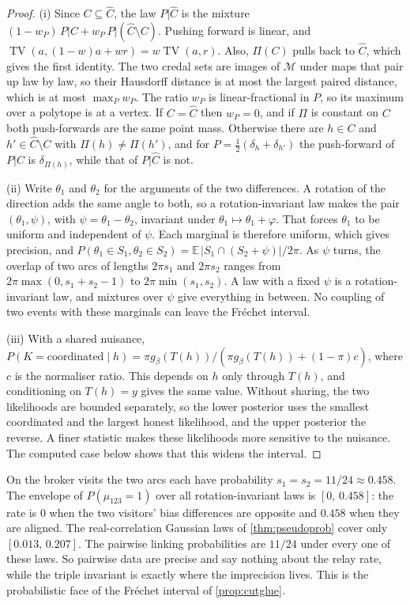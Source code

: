 \documentclass[11pt]{article}
\theoremstyle{definition}\newtheorem{definition}[theorem]{Definition}\newtheorem{remark}[theorem]{Remark}\newtheorem{example}[theorem]{Example}\newtheorem{problem}[theorem]{Open problem}\crefname{problem}{Problem}{Problems}
\begin{document}
\begin{proof}
(i) Since $C\subseteq\hat C$, the law $P|\hat C$ is the mixture $(1-w_P)\,P|C+w_P\,P|(\hat C\setminus C)$. Pushing forward is linear, and $\operatorname{TV}(a,(1-w)a+wr)=w\operatorname{TV}(a,r)$. Also, $\Pi(C)$ pulls back to $\hat C$, which gives the first identity. The two credal sets are images of $\mathcal M$ under maps that pair up law by law, so their Hausdorff distance is at most the largest paired distance, which is at most $\max_Pw_P$. The ratio $w_P$ is linear-fractional in $P$, so its maximum over a polytope is at a vertex. If $C=\hat C$ then $w_P=0$, and if $\Pi$ is constant on $C$ both push-forwards are the same point mass. Otherwise there are $h\in C$ and $h'\in\hat C\setminus C$ with $\Pi(h)\neq\Pi(h')$, and for $P=\tfrac12(\delta_h+\delta_{h'})$ the push-forward of $P|C$ is $\delta_{\Pi(h)}$, while that of $P|\hat C$ is not.

(ii) Write $\theta_1$ and $\theta_2$ for the arguments of the two differences. A rotation of the direction adds the same angle to both, so a rotation-invariant law makes the pair $(\theta_1,\psi)$, with $\psi=\theta_1-\theta_2$, invariant under $\theta_1\mapsto\theta_1+\varphi$. That forces $\theta_1$ to be uniform and independent of $\psi$. Each marginal is therefore uniform, which gives precision, and $P(\theta_1\in S_1,\theta_2\in S_2)=\mathbb E\,|S_1\cap(S_2+\psi)|/2\pi$. As $\psi$ turns, the overlap of two arcs of lengths $2\pi s_1$ and $2\pi s_2$ ranges from $2\pi\max(0,s_1+s_2-1)$ to $2\pi\min(s_1,s_2)$. A law with a fixed $\psi$ is a rotation-invariant law, and mixtures over $\psi$ give everything in between. No coupling of two events with these marginals can leave the Fr\'echet interval.

(iii) With a shared nuisance, $P(K=\text{coordinated}\mid h)=\pi g_\beta(T(h))/(\pi g_\beta(T(h))+(1-\pi)c)$, where $c$ is the normaliser ratio. This depends on $h$ only through $T(h)$, and conditioning on $T(h)=y$ gives the same value. Without sharing, the two likelihoods are bounded separately, so the lower posterior uses the smallest coordinated and the largest honest likelihood, and the upper posterior the reverse. A finer statistic makes these likelihoods more sensitive to the nuisance. The computed case below shows that this widens the interval.
\end{proof}

On the broker visits the two arcs each have probability $s_1=s_2=11/24\approx0.458$. The envelope of $P(\mu_{123}=1)$ over all rotation-invariant laws is $[0,\,0.458]$: the rate is $0$ when the two visitors' bias differences are opposite and $0.458$ when they are aligned. The real-correlation Gaussian laws of \cref{thm:pseudoprob} cover only $[0.013,\,0.207]$. The pairwise linking probabilities are $11/24$ under every one of these laws. So pairwise data are precise and say nothing about the relay rate, while the triple invariant is exactly where the imprecision lives. This is the probabilistic face of the Fr\'echet interval of \cref{prop:cutglue}.
\end{document}
